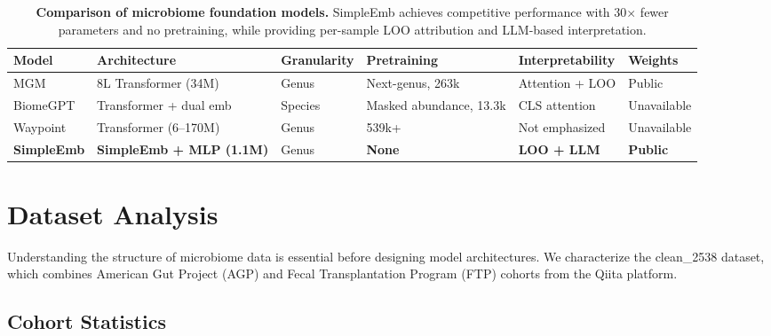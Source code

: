 \documentclass[11pt,a4paper]{article}
\begin{document}
\begin{table}[ht]
\centering
\caption{\textbf{Comparison of microbiome foundation models.}
SimpleEmb achieves competitive performance with 30$\times$ fewer parameters and no pretraining,
while providing per-sample LOO attribution and LLM-based interpretation.}
\label{tab:fm_comparison}
\begin{tabular}{p{2.4cm}p{2.6cm}p{2.0cm}p{2.4cm}p{2.4cm}p{2.2cm}}
\toprule
\textbf{\hspace{0pt}Model} & \textbf{\hspace{0pt}Architecture} & \textbf{\hspace{0pt}Granularity} & \textbf{\hspace{0pt}Pretraining} & \textbf{\hspace{0pt}Interpretability} & \textbf{\hspace{0pt}Weights} \\
\midrule
MGM~\cite{mgm2024} & 8L Transformer (34M) & Genus & Next-genus, 263k & Attention + LOO & Public \\
BiomeGPT~\cite{biomegpt2026} & Transformer + dual emb & Species & Masked abundance, 13.3k & CLS attention & Unavailable \\
Waypoint~\cite{waypoint2026} & Transformer (6--170M) & Genus & 539k+ & Not emphasized & Unavailable \\
\textbf{SimpleEmb} & \textbf{SimpleEmb + MLP (1.1M)} & Genus & \textbf{None} & \textbf{LOO + LLM} & \textbf{Public} \\
\bottomrule
\end{tabular}
\end{table}

\section{Dataset Analysis}

Understanding the structure of microbiome data is essential before designing model architectures. We characterize the clean\_2538 dataset, which combines American Gut Project (AGP) and Fecal Transplantation Program (FTP) cohorts from the Qiita platform.

\subsection{Cohort Statistics}
\end{document}
